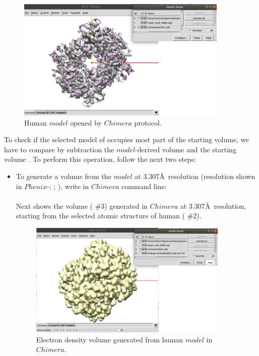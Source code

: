 \begin{itemize}
 \begin{figure}[H]
    \centering 
    \captionsetup{width=.7\linewidth} 
    \includegraphics[width=0.90\textwidth]{Images/Fig42.png}
    \caption{Human  $model$ opened by $Chimera$  protocol.}
    \label{fig:chimera_operate_vol}
   \end{figure}
 
 To check if the selected model of  occupies most part of the starting volume, we have to compare by subtraction the $model$-derived volume and the starting volume . To perform this operation, follow the next two steps:\\
 
  \begin{itemize}
  
  \item To generate a volume from the $model$ at 3.307\AA\ resolution (resolution shown in $Phenix$-; ; ), write in $Chimera$ command line:\\
  
  \\
  
  Next  shows the volume ( \#3) generated in $Chimera$ at 3.307\AA\ resolution, starting from the selected atomic structure of human  ( \#2). 
   
  \begin{figure}[H]
    \centering 
    \captionsetup{width=.7\linewidth} 
    \includegraphics[width=0.90\textwidth]{Images/Fig43.png}
    \caption{Electron density volume generated from human  $model$ in $Chimera$.}
    \label{fig:chimera_operate_vol_2}
   \end{figure}
  

\end{itemize}
\end{itemize}
